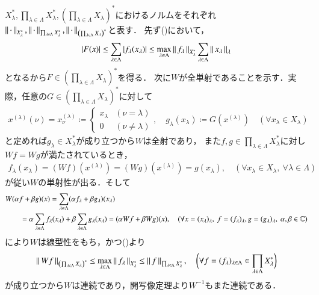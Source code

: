 	\begin{prf}
		$X_\lambda^*,\prod_{\lambda \in \Lambda} X_\lambda^*,\left( \prod_{\lambda \in \Lambda} X_\lambda \right)^*$におけるノルムをそれぞれ
		$\left\|\, \cdot\, \right\|_{X_\lambda^*},\left\|\, \cdot\, \right\|_{\prod_{\lambda \in \Lambda} X_\lambda^*},\left\|\, \cdot\, \right\|_{\left( \prod_{\lambda \in \Lambda} X_\lambda \right)^*}$と表す．
		先ず()において，
		\begin{align}
			|F(x)| \leq \sum_{\lambda \in \Lambda} |f_\lambda(x_\lambda)|
			\leq \operatorname*{max}_{\lambda \in \Lambda} \left\|\, f_\lambda\, \right\|_{X_\lambda^*} \sum_{\lambda \in \Lambda} \left\|\, x_\lambda\, \right\|_{\lambda}
			\label{eq:lem_isomorphism_on_product_of_dual_spaces_2}
		\end{align}
		となるから$F \in \left( \prod_{\lambda \in \Lambda} X_\lambda \right)^*$を得る．
		次に$W$が全単射であることを示す．実際，任意の$G \in \left( \prod_{\lambda \in \Lambda} X_\lambda \right)^*$に対して
		\begin{align}
			x^{(\lambda)}(\nu) = x^{(\lambda)}_\nu \coloneqq 
			\begin{cases}
				x_\lambda & (\nu = \lambda) \\
				0 & (\nu \neq \lambda)
			\end{cases},
			\quad g_\lambda(x_\lambda) \coloneqq G(x^{(\lambda)})
			\quad (\forall x_\lambda \in X_\lambda)
		\end{align}
		と定めれば$g_\lambda \in X_\lambda^*$が成り立つから$W$は全射であり，
		また$f,g \in \prod_{\lambda \in \Lambda} X_\lambda^*$に対し$Wf = Wg$が満たされているとき，
		\begin{align}
			f_\lambda(x_\lambda) = (Wf)(x^{(\lambda)})
			= (Wg)(x^{(\lambda)}) = g(x_\lambda),
			\quad (\forall x_\lambda \in X_\lambda,\ \forall \lambda \in \Lambda)
		\end{align}
		が従い$W$の単射性が出る．そして
		\begin{align}
			&W(\alpha f + \beta g)(x)
			= \sum_{\lambda \in \Lambda} (\alpha f_\lambda + \beta g_\lambda) (x_\lambda) \\
			&\qquad = \alpha \sum_{\lambda \in \Lambda} f_\lambda(x_\lambda)
				+ \beta \sum_{\lambda \in \Lambda} g_\lambda(x_\lambda)
			= (\alpha W f + \beta W g)(x),
			\quad (\forall x=(x_\lambda)_\lambda,\ f=(f_\lambda)_\lambda,g=(g_\lambda)_\lambda,\ \alpha,\beta \in \C)
		\end{align}
		により$W$は線型性をもち，かつ()より
		\begin{align}
			\left\|\, Wf\, \right\|_{\left( \prod_{\lambda \in \Lambda} X_\lambda \right)^*}
			\leq \operatorname*{max}_{\lambda \in \Lambda} \left\|\, f_\lambda\, \right\|_{X_\lambda^*}
			\leq \left\|\, f\, \right\|_{\prod_{\lambda \in \Lambda} X_\lambda^*},
			\quad \biggl( \forall f = (f_\lambda)_{\lambda \in \Lambda} \in \prod_{\lambda \in \Lambda} X_\lambda^* \biggr)
		\end{align}
		が成り立つから$W$は連続であり，開写像定理より$W^{-1}$もまた連続である．
		\QED
	\end{prf}
	
